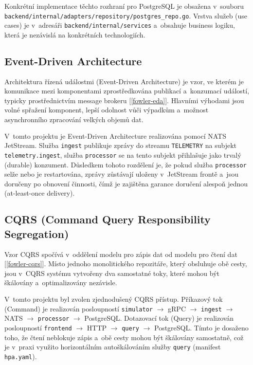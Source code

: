 \documentclass[11pt, a4paper, oneside]{article}
\begin{document}
\vspace{2em}

Konkrétní implementace těchto rozhraní pro PostgreSQL je obsažena v~souboru \texttt{backend/internal/adapters/repository/postgres\_repo.go}. Vrstva služeb (use cases) je v~adresáři \texttt{backend/internal/services} a~obsahuje business logiku, která je nezávislá na konkrétních technologiích.

\subsection{Event-Driven Architecture}

Architektura řízená událostmi (Event-Driven Architecture) je vzor, ve kterém je komunikace mezi komponentami zprostředkována publikací a~konzumací událostí, typicky prostřednictvím message brokeru [\ref{fowler-eda}]. Hlavními výhodami jsou volné spřažení komponent, lepší odolnost vůči výpadkům a~možnost asynchronního zpracování velkých objemů dat.

V~tomto projektu je Event-Driven Architecture realizována pomocí NATS JetStream. Služba \texttt{ingest} publikuje zprávy do streamu \texttt{TELEMETRY} na subjekt \texttt{telemetry.ingest}, služba \texttt{processor} se na tento subjekt přihlašuje jako trvalý (durable) konzument. Důsledkem tohoto rozdělení je, že pokud služba \texttt{processor} selže nebo je restartována, zprávy zůstávají uloženy v~JetStream frontě a~jsou doručeny po obnovení činnosti, čímž je zajištěna garance doručení alespoň jednou (at-least-once delivery).

\subsection{CQRS (Command Query Responsibility Segregation)}

Vzor CQRS spočívá v~oddělení modelu pro zápis dat od modelu pro čtení dat [\ref{fowler-cqrs}]. Místo jednoho monolitického repozitáře, který obsluhuje obě cesty, jsou v~CQRS systému vytvořeny dva samostatné toky, které mohou být škálovány a~optimalizovány nezávisle.

V~tomto projektu byl zvolen zjednodušený CQRS přístup. Příkazový tok (Command) je realizován posloupností \texttt{simulator} $\rightarrow$ gRPC $\rightarrow$ \texttt{ingest} $\rightarrow$ NATS $\rightarrow$ \texttt{processor} $\rightarrow$ PostgreSQL. Dotazovací tok (Query) je realizován posloupností \texttt{frontend} $\rightarrow$ HTTP $\rightarrow$ \texttt{query} $\rightarrow$ PostgreSQL. Tímto je dosaženo toho, že čtení neblokuje zápis a~obě cesty mohou být škálovány samostatně, což je v~praxi využito horizontálním autoškálováním služby \texttt{query} (manifest \texttt{hpa.yaml}).
\end{document}
